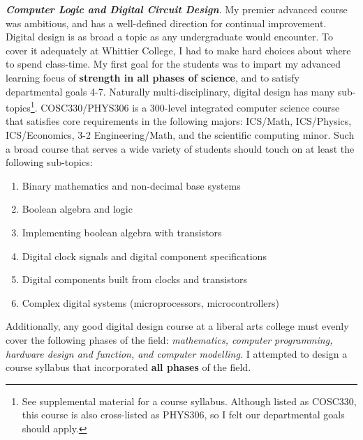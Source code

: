 \documentclass[../../../main.tex]{subfiles}
\begin{document}
\textbf{\textit{Computer Logic and Digital Circuit Design}}. My premier advanced course was ambitious, and has a well-defined direction for continual improvement.  Digital design is as broad a topic as any undergraduate would encounter.  To cover it adequately at Whittier College, I had to make hard choices about where to spend class-time. My first goal for the students was to impart my advanced learning focus of \textbf{strength in all phases of science}, and to satisfy departmental goals 4-7. Naturally multi-disciplinary, digital design has many sub-topics\footnote{See supplemental material for a course syllabus.  Although listed as COSC330, this course is also cross-listed as PHYS306, so I felt our departmental goals should apply.}.  COSC330/PHYS306 is a 300-level integrated computer science course that satisfies core requirements in the following majors: ICS/Math, ICS/Physics, ICS/Economics, 3-2 Engineering/Math, and the scientific computing minor.  Such a broad course that serves a wide variety of students should touch on at least the following sub-topics:

\begin{enumerate}
\item Binary mathematics and non-decimal base systems
\item Boolean algebra and logic
\item Implementing boolean algebra with transistors
\item Digital clock signals and digital component specifications
\item Digital components built from clocks and transistors
\item Complex digital systems (microprocessors, microcontrollers)
\end{enumerate}

Additionally, any good digital design course at a liberal arts college must evenly cover the following phases of the field: \textit{mathematics, computer programming, hardware design and function, and computer modelling.}  I attempted to design a course syllabus that incorporated \textbf{all phases} of the field. \\ \hspace{0.1cm}
\end{document}
